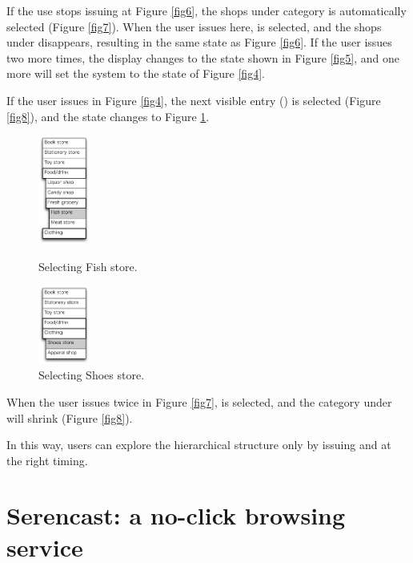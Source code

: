 \documentclass[conference]{IEEEtran}
\def\up{\tsf{▲}}
\def\down{\tsf{▼}}
\begin{document}
If the use stops issuing {\down} at Figure \ref{fig6},
the shops under category  is automatically selected (Figure \ref{fig7}).
%
When the user issues {\up} here,  is selected,
and the shops under  disappears, 
resulting in the same state as Figure \ref{fig6}.
If the user issues {\up} two more times, the display changes to the state
shown in Figure \ref{fig5},
and one more {\up} will set the system to the state of Figure \ref{fig4}.

If the user issues {\down} in Figure \ref{fig4}, the next visible entry
() is selected (Figure \ref{fig8}), and the state changes to Figure \ref{fig9}.

\begin{figure}[H]
  \begin{minipage}{0.45\hsize}
    \centerline{\includegraphics[width=17mm,bb=0 0 139 292]{figures/fig7.pdf}}
    \caption{Selecting Fish store.}
    \label{fig7}
  \end{minipage}
  \begin{minipage}{0.45\hsize}
    \centerline{\includegraphics[width=17mm,bb=0 0 139 211]{figures/fig9.pdf}}
    \caption{Selecting Shoes store.}
    \label{fig9}
  \end{minipage}
\end{figure}

When the user issues {\down} twice in Figure \ref{fig7},
 is selected, and the category under  will shrink (Figure \ref{fig8}).

In this way, users can explore the hierarchical structure
only by issuing {\up} and {\down} at the right timing.

\section{Serencast: a no-click browsing service}
\end{document}
